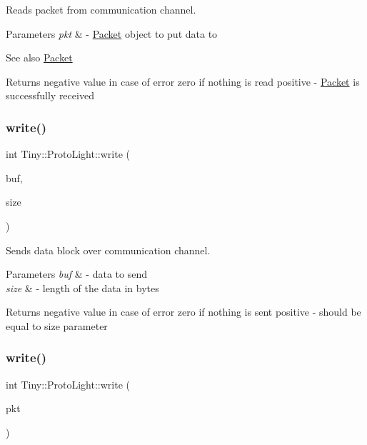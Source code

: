 Reads packet from communication channel. 
\begin{DoxyParams}{Parameters}
{\em pkt} & -\/ \hyperlink{classTiny_1_1Packet}{Packet} object to put data to \\
\hline
\end{DoxyParams}
\begin{DoxySeeAlso}{See also}
\hyperlink{classTiny_1_1Packet}{Packet} 
\end{DoxySeeAlso}
\begin{DoxyReturn}{Returns}
negative value in case of error zero if nothing is read positive -\/ \hyperlink{classTiny_1_1Packet}{Packet} is successfully received 
\end{DoxyReturn}
\mbox{\label{classTiny_1_1ProtoLight_a46a27ee9d0b55c88672c98abf04dbdce}} 
\subsubsection{\texorpdfstring{write()}{write()}\hspace{0.1cm}{\footnotesize\ttfamily [1/2]}}
{\footnotesize\ttfamily int Tiny\+::\+Proto\+Light\+::write (\begin{DoxyParamCaption}\item[{char $\ast$}]{buf,  }\item[{int}]{size }\end{DoxyParamCaption})}

Sends data block over communication channel. 
\begin{DoxyParams}{Parameters}
{\em buf} & -\/ data to send \\
\hline
{\em size} & -\/ length of the data in bytes \\
\hline
\end{DoxyParams}
\begin{DoxyReturn}{Returns}
negative value in case of error zero if nothing is sent positive -\/ should be equal to size parameter 
\end{DoxyReturn}
\mbox{\label{classTiny_1_1ProtoLight_ad980940fd5eca35204a70a5cfe5ccccd}} 
\subsubsection{\texorpdfstring{write()}{write()}\hspace{0.1cm}{\footnotesize\ttfamily [2/2]}}
{\footnotesize\ttfamily int Tiny\+::\+Proto\+Light\+::write (\begin{DoxyParamCaption}\item[{\hyperlink{classTiny_1_1IPacket}{I\+Packet} \&}]{pkt }\end{DoxyParamCaption})}

